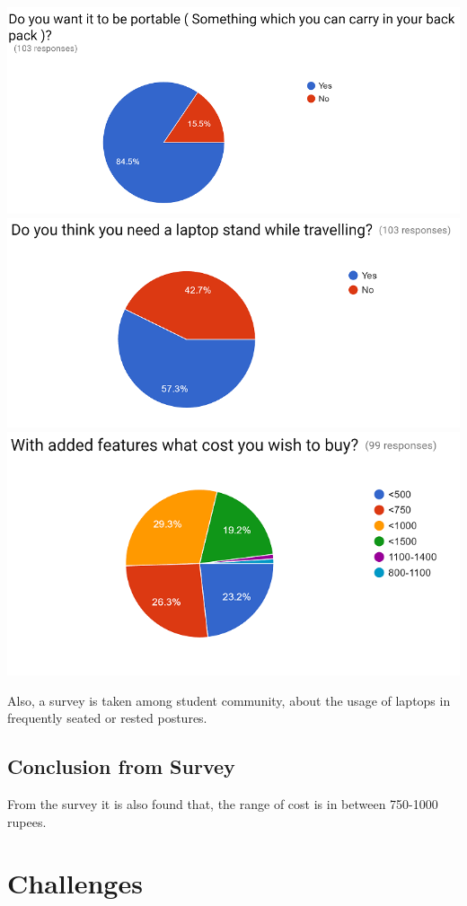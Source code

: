\includegraphics[width=\linewidth]{sur5}
\includegraphics[width=\linewidth]{sur6}
\includegraphics[width=\linewidth]{sur7}

Also, a survey is taken among student community, about the usage of laptops in frequently seated or rested postures. 


\section{Conclusion from Survey}

From the survey it is also found that, the range of cost is in between 750-1000 rupees.

\chapter{Challenges}

